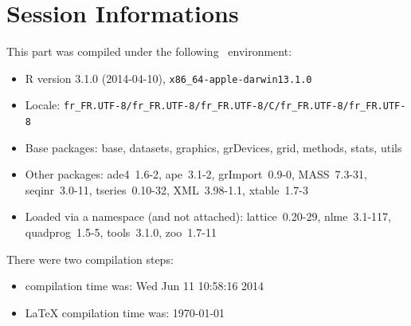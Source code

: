 \documentclass{article}
\begin{document}
\section*{Session Informations}

\begin{scriptsize}

This part was compiled under the following \Rlogo{}~environment:

\begin{itemize}\raggedright
  \item R version 3.1.0 (2014-04-10), \verb|x86_64-apple-darwin13.1.0|
  \item Locale: \verb|fr_FR.UTF-8/fr_FR.UTF-8/fr_FR.UTF-8/C/fr_FR.UTF-8/fr_FR.UTF-8|
  \item Base packages: base, datasets, graphics, grDevices, grid,
    methods, stats, utils
  \item Other packages: ade4~1.6-2, ape~3.1-2, grImport~0.9-0,
    MASS~7.3-31, seqinr~3.0-11, tseries~0.10-32, XML~3.98-1.1,
    xtable~1.7-3
  \item Loaded via a namespace (and not attached): lattice~0.20-29,
    nlme~3.1-117, quadprog~1.5-5, tools~3.1.0, zoo~1.7-11
\end{itemize}
There were two compilation steps:

\begin{itemize}
  \item \Rlogo{} compilation time was: Wed Jun 11 10:58:16 2014
  \item \LaTeX{} compilation time was: \today
\end{itemize}

\end{scriptsize}


\clearpage
{}


\end{document}
